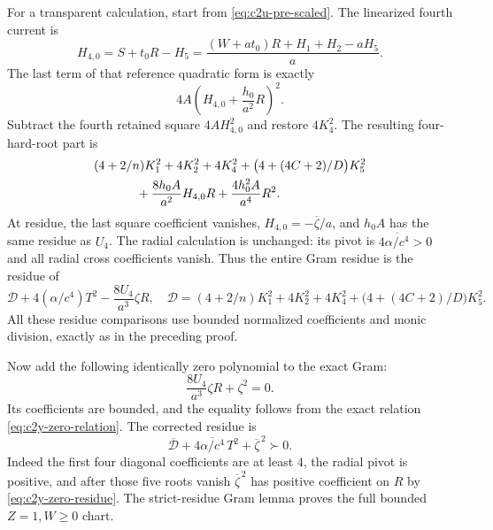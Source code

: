 For a transparent calculation, start from
\eqref{eq:c2u-pre-scaled}.  The linearized fourth current is
\[
H_{4,0}=S+t_0R-H_5
=\frac{(W+at_0)R+H_1+H_2-aH_5}{a}.
\]
The last term of that reference quadratic form is exactly
\[
4A\left(H_{4,0}+\frac{h_0}{a^2}R\right)^2.
\]
Subtract the fourth retained square $4AH_{4,0}^2$ and restore
$4K_4^2$.  The resulting four-hard-root part is
\[
\begin{split}
&(4+2/n)K_1^2+4K_2^2+4K_4^2
 +\bigl(4+(4C+2)/D\bigr)K_5^2\\
&\hspace{12mm}+\frac{8h_0A}{a^2}H_{4,0}R
 +\frac{4h_0^2A}{a^4}R^2.
\end{split}
\]
At residue, the last square coefficient vanishes,
$H_{4,0}=-\overline\zeta/a$, and $h_0A$ has the same residue as $U_4$.
The radial calculation is unchanged: its pivot is
$4\overline{\alpha/c^4}>0$ and all radial cross coefficients vanish.
Thus the entire Gram residue is the residue of
\begin{equation}
\mathcal D+4(\alpha/c^4)T^2-\frac{8U_4}{a^3}\zeta R,
\quad
\mathcal D=(4+2/n)K_1^2+4K_2^2+4K_4^2
+\bigl(4+(4C+2)/D\bigr)K_5^2.
\label{eq:c2y-uncorrected}
\end{equation}
All these residue comparisons use bounded normalized coefficients and
monic division, exactly as in the preceding proof.

Now add the following identically zero polynomial to the exact Gram:
\begin{equation}
\frac{8U_4}{a^3}\zeta R+\zeta^2=0.
\label{eq:c2y-zero-correction}
\end{equation}
Its coefficients are bounded, and the equality follows from the exact
relation \eqref{eq:c2y-zero-relation}.  The corrected residue is
\[
\overline{\mathcal D}
+4\overline{\alpha/c^4}\,T^2+\overline\zeta^{\,2}\succ0.
\]
Indeed the first four diagonal coefficients are at least $4$, the radial
pivot is positive, and after those five roots vanish
$\overline\zeta^{\,2}$ has positive coefficient on $R$ by
\eqref{eq:c2y-zero-residue}.  The strict-residue Gram lemma proves the
full bounded $Z=1,W\geq0$ chart.

